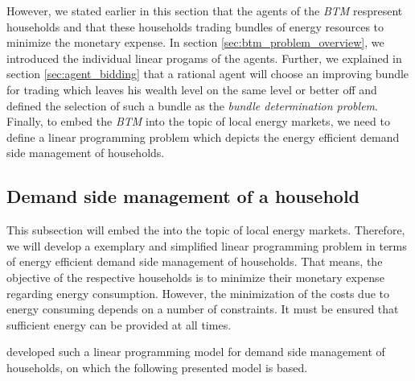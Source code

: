 However, we stated earlier in this section that the agents of the \textit{BTM} respresent households
and that these households trading bundles of energy resources to minimize the monetary expense. 
In section \ref{sec:btm_problem_overview}, we introduced the individual linear progams of the agents.
Further, we explained in section \ref{sec:agent_bidding} that a rational agent will choose an improving bundle for 
trading which leaves his wealth level on the same level or better off and defined the selection of such a bundle 
as the \textit{bundle determination problem}.
Finally, to embed the \textit{BTM} into the topic of local energy markets, we need to define 
a linear programming problem which depicts the energy efficient demand side management of households.

\subsection{Demand side management of a household}
This subsection will embed the  into the topic of local energy markets. 
Therefore, we will develop a exemplary and simplified linear programming problem in terms of energy efficient demand side management of households.  
That means, the objective of the respective households is to minimize their monetary expense regarding energy consumption.
However, the minimization of the costs due to energy consuming depends on a number of constraints. 
It must be ensured that sufficient energy can be provided at all times.

 developed such a linear programming model for demand side management of households, on which the following
presented model is based. 

